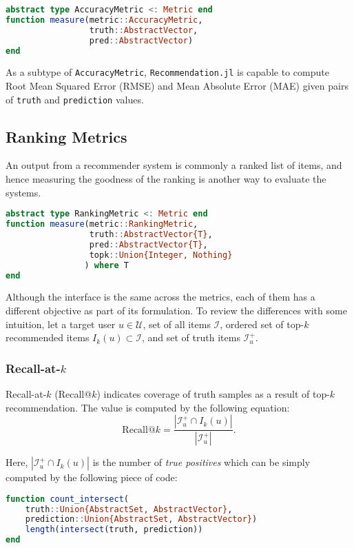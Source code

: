 \begin{lstlisting}[language = Julia]
abstract type AccuracyMetric <: Metric end
function measure(metric::AccuracyMetric, 
                 truth::AbstractVector, 
                 pred::AbstractVector)
end  
\end{lstlisting}

As a subtype of \texttt{AccuracyMetric}, \texttt{Recommendation.jl} is capable to compute Root Mean Squared Error (RMSE) and Mean Absolute Error (MAE) given pairs of \texttt{truth} and \texttt{prediction} values.

\subsection{Ranking Metrics}
\label{sec:ranking-metrics}

An output from a recommender system is commonly a ranked list of items, and hence measuring the goodness of the ranking is another way to evaluate the systems. 

\begin{lstlisting}[language = Julia]
abstract type RankingMetric <: Metric end
function measure(metric::RankingMetric, 
                 truth::AbstractVector{T}, 
                 pred::AbstractVector{T}, 
                 topk::Union{Integer, Nothing}
                ) where T
end
\end{lstlisting}

Although the interface is the same across the metrics, each of them has a different objective as part of its formulation. To review the differences with some intuition, let a target user $u \in \mathcal{U}$, set of all items $\mathcal{I}$, ordered set of top-$k$ recommended items $I_k(u) \subset \mathcal{I}$, and set of truth items $\mathcal{I}^+_u$. 

\subsubsection{Recall-at-$k$}

Recall-at-$k$ (Recall@$k$) indicates coverage of truth samples as a result of top-$k$ recommendation. The value is computed by the following equation:
$$
\mathrm{Recall@}k = \frac{|\mathcal{I}^+_u \cap I_k(u)|}{|\mathcal{I}^+_u|}.
$$

Here, $|\mathcal{I}^+_u \cap I_k(u)|$ is the number of \textit{true positives} which can be simply computed by the following piece of code:

\begin{lstlisting}[language = Julia]
function count_intersect(
    truth::Union{AbstractSet, AbstractVector}, 
    prediction::Union{AbstractSet, AbstractVector})
    length(intersect(truth, prediction))
end
\end{lstlisting}


